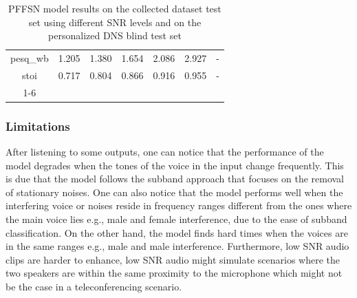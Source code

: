 \begin{table}[]
\begin{tabular}{ccccccc}
        pesq\_wb                & 1.205                                                 & 1.380                                                                                 & 1.654 & 2.086 & 2.927 & -     \\
        stoi                    & 0.717                                                 & 0.804                                                                                 & 0.866 & 0.916 & 0.955 & -     \\ \cline{1-6}
    \end{tabular}
    \caption{PFFSN model results on the collected dataset test set using different SNR levels and on the personalized DNS blind test set}
    \label{tab:pffsn-results}
\end{table}


\subsubsection{Limitations}
After listening to some outputs, one can notice that the performance of the model degrades when the tones of the voice in the input change frequently.
This is due that the model follows the subband approach that focuses on the removal of stationary noises.
One can also notice that the model performs well when the interfering voice or noises reside in frequency ranges different from the ones where the main voice lies e.g., male and female interference,
due to the ease of subband classification. On the other hand, the model finds hard times when the voices are in the same ranges e.g., male and male interference.
Furthermore, low SNR audio clips are harder to enhance, low SNR audio might simulate scenarios where the two speakers are within the same proximity to the microphone which might not be the case in a teleconferencing scenario.
